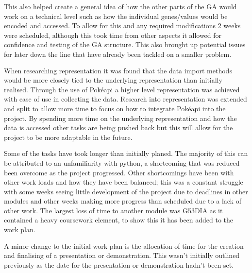 \documentclass[a4paper]{article}
\newcommand{\Pokeapi}{Pok\'{e}api}
\begin{document}
This also helped create a general idea of how the other parts of the GA would work on a technical level such as how the individual genes/values would be encoded and accessed.
To allow for this and any required modifications 2 weeks were scheduled, although this took time from other aspects it allowed for confidence and testing of the GA structure.
This also brought up potential issues for later down the line that have already been tackled on a smaller problem.
\par
When researching representation it was found that the data import methods would be more closely tied to the underlying representation than initially realised.
Through the use of \Pokeapi{} a higher level representation was achieved with ease of use in collecting the data.
Research into representation was extended and split to allow more time to focus on how to integrate \Pokeapi{} into the project.
By spending more time on the underlying representation and how the data is accessed other tasks are being pushed back but this will allow for the project to be more adaptable in the future.
\par
Some of the tasks have took longer than initially planed.
The majority of this can be attributed to an unfamiliarity with python, a shortcoming that was reduced been overcome as the project progressed.
Other shortcomings have been with other work loads and how they have been balanced; this was a constant struggle with some weeks seeing little development of the project due to deadlines in other modules and other weeks making more progress than scheduled due to a lack of other work.
The largest loss of time to another module was G53DIA as it contained a heavy coursework element, to show this it has been added to the work plan.
\par
A minor change to the initial work plan is the allocation of time for the creation and finalising of a presentation or demonstration.
This wasn't initially outlined previously as the date for the presentation or demonstration hadn't been set.
\end{document}
